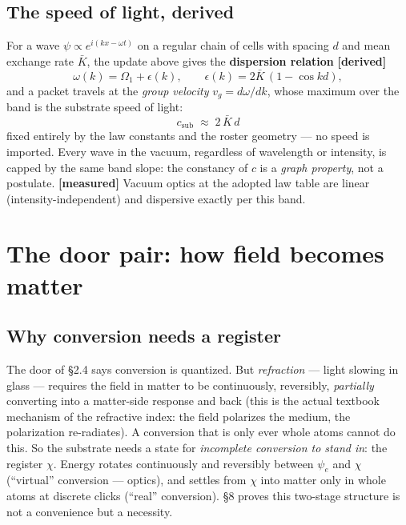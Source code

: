 \subsection{The speed of light,
derived}\label{the-speed-of-light-derived}

For a wave \(\psi \propto e^{i(kx - \omega t)}\) on a regular chain of
cells with spacing \(d\) and mean exchange rate \(\bar K\), the update
above gives the \textbf{dispersion relation} \textbf{{[}derived{]}}
\[\omega(k) = \Omega_1 + \epsilon(k), \qquad
  \epsilon(k) = 2\bar K\,(1 - \cos kd),\] and a packet travels at the
\emph{group velocity} \(v_g = d\omega/dk\), whose maximum over the band
is the substrate speed of light:
\[\boxed{\;c_{\mathrm{sub}} \;\approx\; 2\,\bar K\, d\;}\] fixed
entirely by the law constants and the roster geometry --- no speed is
imported. Every wave in the vacuum, regardless of wavelength or
intensity, is capped by the same band slope: the constancy of \(c\) is a
\emph{graph property}, not a postulate. \textbf{{[}measured{]}} Vacuum
optics at the adopted law table are linear (intensity-independent) and
dispersive exactly per this band.

\section{The door pair: how field becomes
matter}\label{the-door-pair-how-field-becomes-matter}

\subsection{Why conversion needs a
register}\label{why-conversion-needs-a-register}

The door of §2.4 says conversion is quantized. But \emph{refraction} ---
light slowing in glass --- requires the field in matter to be
continuously, reversibly, \emph{partially} converting into a matter-side
response and back (this is the actual textbook mechanism of the
refractive index: the field polarizes the medium, the polarization
re-radiates). A conversion that is only ever whole atoms cannot do this.
So the substrate needs a state for \emph{incomplete conversion to stand
in}: the register \(\chi\). Energy rotates continuously and reversibly
between \(\psi_e\) and \(\chi\) (``virtual'' conversion --- optics), and
settles from \(\chi\) into matter only in whole atoms at discrete clicks
(``real'' conversion). §8 proves this two-stage structure is not a
convenience but a necessity.

